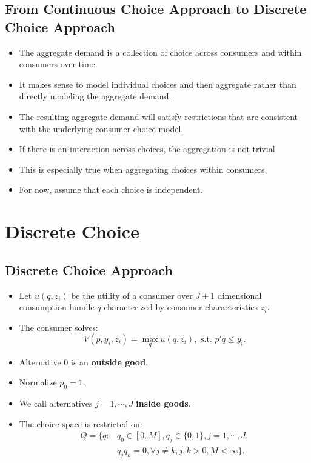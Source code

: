 \documentclass[
]{book}
\providecommand{\tightlist}{%
  \setlength{\itemsep}{0pt}\setlength{\parskip}{0pt}}
\begin{document}
\hypertarget{from-continuous-choice-approach-to-discrete-choice-approach}{%
\subsection{From Continuous Choice Approach to Discrete Choice Approach}\label{from-continuous-choice-approach-to-discrete-choice-approach}}

\begin{itemize}
\tightlist
\item
  The aggregate demand is a collection of choice across consumers and within consumers over time.
\item
  It makes sense to model individual choices and then aggregate rather than directly modeling the aggregate demand.
\item
  The resulting aggregate demand will satisfy restrictions that are consistent with the underlying consumer choice model.
\item
  If there is an interaction across choices, the aggregation is not trivial.
\item
  This is especially true when aggregating choices within consumers.
\item
  For now, assume that each choice is independent.
\end{itemize}

\hypertarget{discrete-choice}{%
\section{Discrete Choice}\label{discrete-choice}}

\hypertarget{discrete-choice-approach}{%
\subsection{Discrete Choice Approach}\label{discrete-choice-approach}}

\begin{itemize}
\tightlist
\item
  Let \(u(q, z_i)\) be the utility of a consumer over \(J + 1\) dimensional consumption bundle \(q\) characterized by consumer characteristics \(z_i\).
\item
  The consumer solves:
  \begin{equation}
  V(p, y_i, z_i) = \max_{q}u(q, z_i), \text{   s.t.   } p'q \le y_i.
  \end{equation}
\item
  Alternative \(0\) is an \textbf{outside good}.
\item
  Normalize \(p_0 = 1\).
\item
  We call alternatives \(j = 1, \cdots, J\) \textbf{inside goods}.
\item
  The choice space is restricted on:
  \begin{equation}
  \begin{split}
  Q = \{q:& q_0 \in [0, M], q_j \in \{0, 1\}, j = 1, \cdots, J,\\
  & q_j q_k = 0, \forall j \neq k, j, k > 0, M < \infty\}.
  \end{split}
  \end{equation}
\end{itemize}
\end{document}
